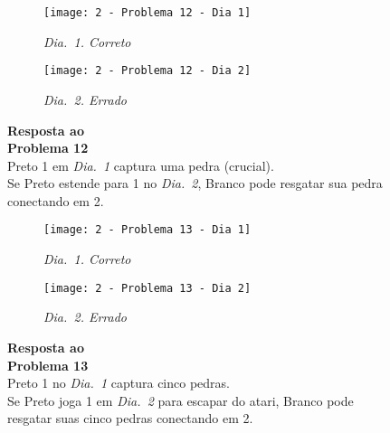 \begin{SCfigure}[][h!]
    \begin{subfigure}[t]{.31\textwidth}
        \texttt{[image: 2 - Problema 12 - Dia 1]}
        \captionsetup{justification=centering}
        \caption*{\emph{Dia.\@~1. Correto}}
    \end{subfigure}
    \hfill
    \begin{subfigure}[t]{.31\textwidth}
        \texttt{[image: 2 - Problema 12 - Dia 2]}
        \captionsetup{justification=centering}
        \caption*{\emph{Dia.\@~2. Errado}}
    \end{subfigure}
    \hfill
    \caption*{\textbf{Resposta ao\\Problema 12}\\\vspace*{.25cm}Preto 1 em \emph{Dia.\@~1} captura uma pedra (crucial).\\\vspace*{.25cm}Se Preto estende para 1 no \emph{Dia.\@~2}, Branco pode resgatar sua pedra conectando em 2.}
\end{SCfigure}

\pagebreak

\begin{SCfigure}[][h!]
    \begin{subfigure}[t]{.31\textwidth}
        \texttt{[image: 2 - Problema 13 - Dia 1]}
        \captionsetup{justification=centering}
        \caption*{\emph{Dia.\@~1. Correto}}
    \end{subfigure}
    \hfill
    \begin{subfigure}[t]{.31\textwidth}
        \texttt{[image: 2 - Problema 13 - Dia 2]}
        \captionsetup{justification=centering}
        \caption*{\emph{Dia.\@~2. Errado}}
    \end{subfigure}
    \hfill
    \caption*{\textbf{Resposta ao\\Problema 13}\\\vspace*{.25cm}Preto 1 no \emph{Dia.\@~1} captura cinco pedras.\\\vspace*{.25cm}Se Preto joga 1 em \emph{Dia.\@~2} para escapar do atari, Branco pode resgatar suas cinco pedras conectando em 2.}
\end{SCfigure}

\vfill

